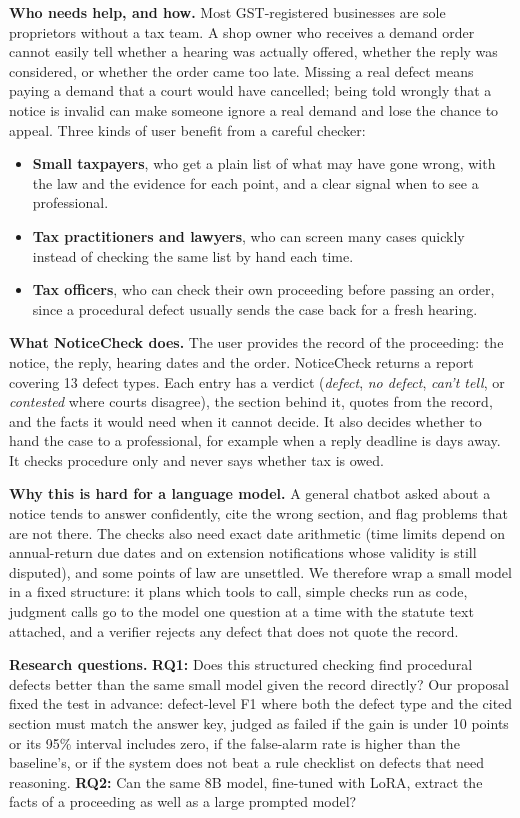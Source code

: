 \documentclass[10pt,a4paper]{article}
\begin{document}
\textbf{Who needs help, and how.} Most GST-registered businesses are sole proprietors without a tax team. A shop owner who receives a demand order cannot easily tell whether a hearing was actually offered, whether the reply was considered, or whether the order came too late. Missing a real defect means paying a demand that a court would have cancelled; being told wrongly that a notice is invalid can make someone ignore a real demand and lose the chance to appeal. Three kinds of user benefit from a careful checker:
\begin{itemize}
\item \textbf{Small taxpayers}, who get a plain list of what may have gone wrong, with the law and the evidence for each point, and a clear signal when to see a professional.
\item \textbf{Tax practitioners and lawyers}, who can screen many cases quickly instead of checking the same list by hand each time.
\item \textbf{Tax officers}, who can check their own proceeding before passing an order, since a procedural defect usually sends the case back for a fresh hearing.
\end{itemize}

\textbf{What NoticeCheck does.} The user provides the record of the proceeding: the notice, the reply, hearing dates and the order. NoticeCheck returns a report covering 13 defect types. Each entry has a verdict (\emph{defect}, \emph{no defect}, \emph{can't tell}, or \emph{contested} where courts disagree), the section behind it, quotes from the record, and the facts it would need when it cannot decide. It also decides whether to hand the case to a professional, for example when a reply deadline is days away. It checks procedure only and never says whether tax is owed.

\textbf{Why this is hard for a language model.} A general chatbot asked about a notice tends to answer confidently, cite the wrong section, and flag problems that are not there. The checks also need exact date arithmetic (time limits depend on annual-return due dates and on extension notifications whose validity is still disputed), and some points of law are unsettled. We therefore wrap a small model in a fixed structure: it plans which tools to call, simple checks run as code, judgment calls go to the model one question at a time with the statute text attached, and a verifier rejects any defect that does not quote the record.

\textbf{Research questions.}
\textbf{RQ1:} Does this structured checking find procedural defects better than the same small model given the record directly? Our proposal fixed the test in advance: defect-level F1 where both the defect type and the cited section must match the answer key, judged as failed if the gain is under 10 points or its 95\% interval includes zero, if the false-alarm rate is higher than the baseline's, or if the system does not beat a rule checklist on defects that need reasoning.
\textbf{RQ2:} Can the same 8B model, fine-tuned with LoRA, extract the facts of a proceeding as well as a large prompted model?
\end{document}
